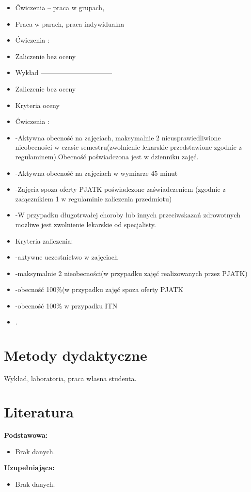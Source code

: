 \documentclass[12pt, a4paper]{article}
\begin{document}
\begin{itemize}
  \item Ćwiczenia – praca w grupach,
  \item Praca w parach, praca indywidualna
  \item Ćwiczenia :
  \item Zaliczenie bez oceny
  \item Wykład --------------------------------
  \item Zaliczenie bez oceny
  \item Kryteria oceny
  \item Ćwiczenia :
  \item -Aktywna obecność na zajęciach, maksymalnie 2 nieusprawiedliwione nieobecności w czasie semestru(zwolnienie lekarskie przedstawione zgodnie z regulaminem).Obecność poświadczona jest w dzienniku zajęć.
  \item -Aktywna obecność na zajęciach w wymiarze 45 minut
  \item -Zajęcia spoza oferty PJATK poświadczone zaświadczeniem (zgodnie z załącznikiem 1 w regulaminie zaliczenia przedmiotu)
  \item -W przypadku długotrwałej choroby lub innych przeciwskazań zdrowotnych możliwe jest zwolnienie lekarskie od specjalisty.
  \item Kryteria zaliczenia:
  \item -aktywne uczestnictwo w zajęciach
  \item -maksymalnie 2 nieobecności(w przypadku zajęć realizowanych przez PJATK)
  \item -obecność 100\%(w przypadku zajęć spoza oferty PJATK
  \item -obecność 100\% w przypadku ITN
  \item .
\end{itemize}

\section{Metody dydaktyczne}

Wykład, laboratoria, praca własna studenta.

\section{Literatura}

\textbf{Podstawowa:}
\begin{itemize}
  \item Brak danych.
\end{itemize}

\textbf{Uzupełniająca:}
\begin{itemize}
  \item Brak danych.
\end{itemize}
\end{document}
